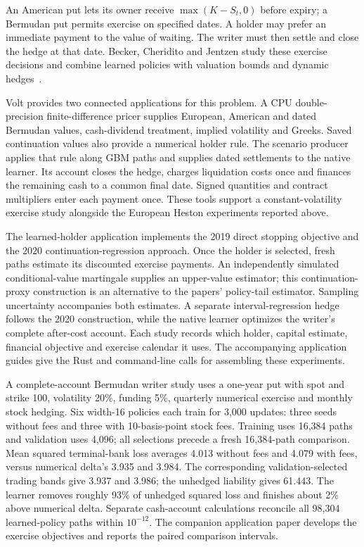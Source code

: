 \documentclass[8pt]{strategynet-journal}
\begin{document}
\begin{SNcolumns}
An American put lets its owner receive $\max(K-S_t,0)$ before expiry; a
Bermudan put permits exercise on specified dates. A holder may prefer an
immediate payment to the value of waiting. The writer must then settle and
close the hedge at that date. Becker, Cheridito and Jentzen study these
exercise decisions and combine learned policies with valuation bounds and
dynamic hedges~\cite{stopping,american}.

Volt provides two connected applications for this problem. A CPU
double-precision finite-difference pricer supplies European, American and
dated Bermudan values, cash-dividend treatment, implied volatility and
Greeks. Saved continuation values also provide a numerical holder rule.
The scenario producer applies that rule along GBM paths and supplies dated
settlements to the native learner. Its account closes the hedge, charges
liquidation costs once and finances the remaining cash to a common final
date. Signed quantities and contract multipliers enter each payment once.
These tools support a constant-volatility exercise study alongside the
European Heston experiments reported above.

The learned-holder application implements the 2019 direct stopping objective
and the 2020 continuation-regression approach. Once the holder is selected,
fresh paths estimate its discounted exercise payments. An independently
simulated conditional-value martingale supplies an upper-value estimator;
this continuation-proxy construction is an alternative to the papers'
policy-tail estimator. Sampling uncertainty accompanies both estimates.
A separate interval-regression hedge follows the 2020 construction, while
the native learner optimizes the writer's complete after-cost account.
Each study records which holder, capital estimate, financial objective and
exercise calendar it uses. The accompanying application guides give the
Rust and command-line calls for assembling these experiments.

A complete-account Bermudan writer study uses a one-year put with spot and
strike 100, volatility 20\%, funding 5\%, quarterly numerical exercise and
monthly stock hedging. Six width-16 policies each train for 3,000 updates:
three seeds without fees and three with 10-basis-point stock fees. Training
uses 16,384 paths and validation uses 4,096; all selections precede a fresh
16,384-path comparison. Mean squared terminal-bank loss averages 4.013
without fees and 4.079 with fees, versus numerical delta's 3.935 and 3.984.
The corresponding validation-selected trading bands give 3.937 and 3.986;
the unhedged liability gives 61.443. The learner removes roughly 93\% of
unhedged squared loss and finishes about 2\% above numerical delta.
Separate cash-account calculations reconcile all 98,304 learned-policy
paths within $10^{-12}$. The companion application paper develops the
exercise objectives and reports the paired comparison intervals.


\end{SNcolumns}
\end{document}
